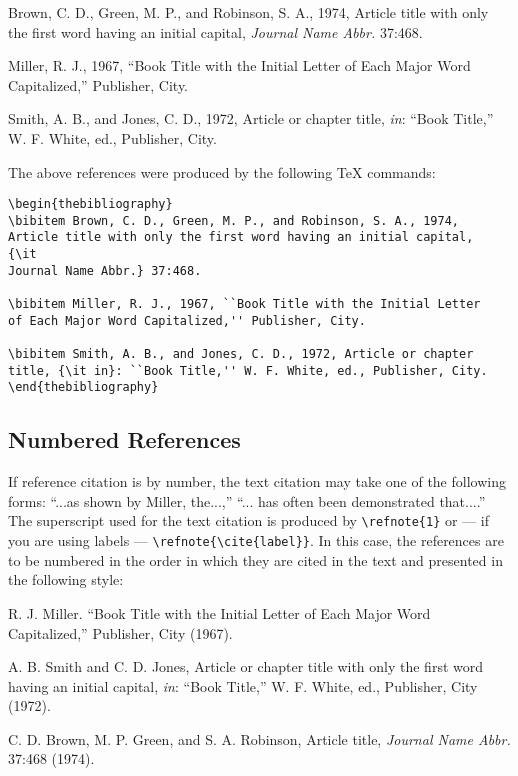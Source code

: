 \documentclass[12pt]{book}
\begin{document}
\begin{thebibliography}
\bibitem Brown, C. D., Green, M. P., and Robinson, S. A., 1974,
Article title with only the first word having an initial capital,
{\it
Journal Name Abbr.} 37:468.

\bibitem Miller, R. J., 1967, ``Book Title with the Initial Letter
of Each Major Word Capitalized,'' Publisher, City.

\bibitem Smith, A. B., and Jones, C. D., 1972, Article or chapter
title, {\it in}: ``Book Title,'' W. F. White, ed., Publisher, City.
\end{thebibliography}

\smallskip

The above references were produced by the following {\TeX}
commands:
\begin{verbatim}
\begin{thebibliography}
\bibitem Brown, C. D., Green, M. P., and Robinson, S. A., 1974,
Article title with only the first word having an initial capital,
{\it
Journal Name Abbr.} 37:468.

\bibitem Miller, R. J., 1967, ``Book Title with the Initial Letter
of Each Major Word Capitalized,'' Publisher, City.

\bibitem Smith, A. B., and Jones, C. D., 1972, Article or chapter
title, {\it in}: ``Book Title,'' W. F. White, ed., Publisher, City.
\end{thebibliography}
\end{verbatim}

\subsection{Numbered References}

If reference citation is by number, the text citation may take one
of the following forms: ``...as shown by Miller,
the...,'' ``... has often been demonstrated that....''
The superscript used for the text citation is produced
by \verb+\refnote{1}+ or --- if you are using labels ---
\verb+\refnote{\cite{label}}+. In this case, the references are to
be numbered in the order in which they are cited in the text and
presented in the following style:

\begin{numbibliography}
R. J. Miller. ``Book Title with the Initial Letter
of
Each Major Word Capitalized,'' Publisher, City (1967).

A. B. Smith and C. D. Jones, Article or
chapter
title with only the first word having an initial capital, {\it in}:
``Book Title,'' W. F. White, ed., Publisher, City (1972).

\bibitem{}C. D. Brown, M. P. Green, and S. A. Robinson, Article
title, {\it Journal Name Abbr.} 37:468 (1974).
\end{numbibliography}
\end{document}

